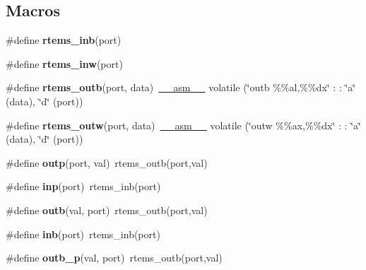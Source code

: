 \subsection*{Macros}
\begin{DoxyCompactItemize}
\item 
\#define {\bfseries rtems\+\_\+inb}(port)
\item 
\#define {\bfseries rtems\+\_\+inw}(port)
\item 
\mbox{\label{group__i386__io_ga52aacab82ef60fbf0be5f8cc5b8f3870}} 
\#define {\bfseries rtems\+\_\+outb}(port,  data)~\mbox{\hyperlink{group__RTEMSScoreCPUSPARC_ga82257d4fc068f4b21b029dd69d276839}{\+\_\+\+\_\+asm\+\_\+\+\_\+}} volatile (\char`\"{}outb \%\%al,\%\%dx\char`\"{} \+: \+: \char`\"{}a\char`\"{} (data), \char`\"{}d\char`\"{} (port))
\item 
\mbox{\label{group__i386__io_ga1671f4332219f9626a23e662dfd8663f}} 
\#define {\bfseries rtems\+\_\+outw}(port,  data)~\mbox{\hyperlink{group__RTEMSScoreCPUSPARC_ga82257d4fc068f4b21b029dd69d276839}{\+\_\+\+\_\+asm\+\_\+\+\_\+}} volatile (\char`\"{}outw \%\%ax,\%\%dx\char`\"{} \+: \+: \char`\"{}a\char`\"{} (data), \char`\"{}d\char`\"{} (port))
\item 
\mbox{\label{group__i386__io_gae6ba64d1f7f35ad94007a9c3ca235bad}} 
\#define {\bfseries outp}(port,  val)~rtems\+\_\+outb(port,val)
\item 
\mbox{\label{group__i386__io_ga5cfa4750a0633c34c7a361d8fd62c042}} 
\#define {\bfseries inp}(port)~rtems\+\_\+inb(port)
\item 
\mbox{\label{group__i386__io_ga13a08fb35b29adb9118a97a132f09005}} 
\#define {\bfseries outb}(val,  port)~rtems\+\_\+outb(port,val)
\item 
\mbox{\label{group__i386__io_gad6488a48837d179b1833e2f48dac9665}} 
\#define {\bfseries inb}(port)~rtems\+\_\+inb(port)
\item 
\mbox{\label{group__i386__io_ga2f682e9b037880c74e7e9699b226917a}} 
\#define {\bfseries outb\+\_\+p}(val,  port)~rtems\+\_\+outb(port,val)
\item 
\mbox{\label{group__i386__io_gabbb81c8eae91d64a9b30d940985d09fc}} 

\end{DoxyCompactItemize}
